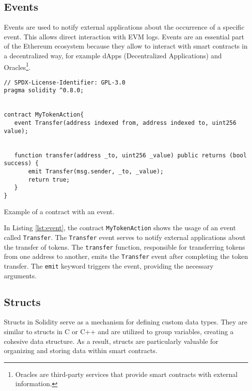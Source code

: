 \subsection{Events}

Events are used to notify external applications about the occurrence of a specific event. This allows direct interaction with EVM logs.
Events are an essential part of the Ethereum ecosystem because they allow to interact with smart contracts in a decentralized way, for example
dApps (Decentralized Applications) and Oracles\footnote{Oracles are third-party services that provide smart contracts with external information.}.

\begin{listing}[!ht]
   \begin{verbatim}
// SPDX-License-Identifier: GPL-3.0
pragma solidity ^0.8.0;


contract MyTokenAction{
   event Transfer(address indexed from, address indexed to, uint256 value);


   function transfer(address _to, uint256 _value) public returns (bool success) {
       emit Transfer(msg.sender, _to, _value);
       return true;
   }
}
   \end{verbatim}
   \caption{Example of a contract with an event.}
   \label{lst:event}
\end{listing}


In Listing \ref{lst:event}, the contract \texttt{MyTokenAction} shows the usage of an event called \texttt{Transfer}. The \texttt{Transfer} event serves to notify external applications about the transfer of tokens. The \texttt{transfer} function, responsible for transferring tokens from one address to another, emits the
\texttt{Transfer} event after completing the token transfer. The \texttt{emit} keyword triggers the event, providing the necessary arguments.


\subsection{Structs}

Structs in Solidity serve as a mechanism for defining custom data types. They are similar to structs in C or C++ and are utilized to group variables, creating a cohesive 
data structure. As a result, structs are particularly valuable for organizing and storing data within smart contracts.


